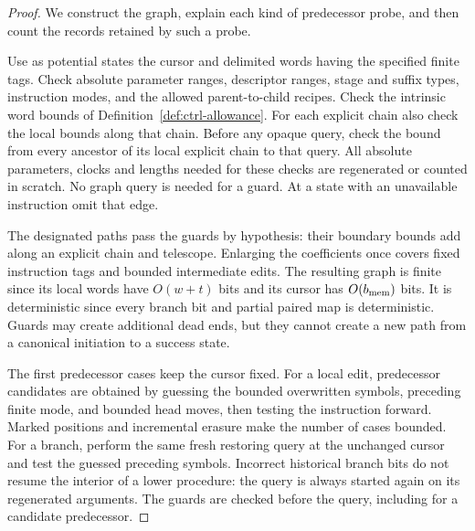 \documentclass[11pt]{article}
\numberwithin{equation}{section}
\theoremstyle{definition}
\theoremstyle{remark}
\begin{document}
\begin{proof}
We construct the graph, explain each kind of predecessor probe, and then count the records retained by such a probe.

Use as potential states the cursor and delimited words having the
specified finite tags.  Check absolute parameter ranges, descriptor
ranges, stage and suffix types, instruction modes, and the allowed
parent-to-child recipes.  Check the intrinsic word bounds of
Definition~\ref{def:ctrl-allowance}.  For each explicit chain also check
the local bounds along that chain.  Before any opaque query, check the
bound from every ancestor of its local explicit chain to that query.
All absolute parameters, clocks and lengths needed for these checks are
regenerated or counted in scratch.  No graph query is needed for a
guard.  At a state with an unavailable instruction omit that edge.

The designated paths pass the guards by hypothesis: their boundary
bounds add along an explicit chain and telescope.  Enlarging the
coefficients once covers fixed instruction tags and bounded intermediate
edits.  The resulting graph is finite since its local words have
$O(w+t)$ bits and its cursor has $O({b_{\rm mem}})$ bits.  It is deterministic since
every branch bit and partial paired map is deterministic.  Guards may
create additional dead ends, but they cannot create a new path from a
canonical initiation to a success state.

The first predecessor cases keep the cursor fixed. For a local edit, predecessor candidates are obtained by guessing the
bounded overwritten symbols, preceding finite mode, and bounded head
moves, then testing the instruction forward.  Marked positions and
incremental erasure make the number of cases bounded.  For a branch,
perform the same fresh restoring query at the unchanged cursor and test
the guessed preceding symbols.  Incorrect historical branch bits do not
resume the interior of a lower procedure: the query is always started
again on its regenerated arguments.  The guards are checked before the
query, including for a candidate predecessor.


\end{proof}
\end{document}
